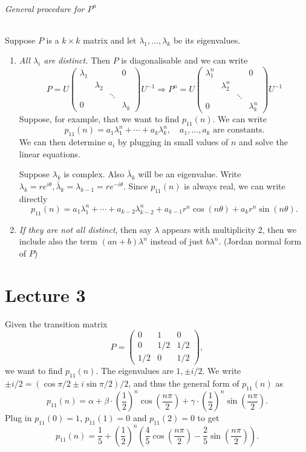 \documentclass[a4paper]{article}
\begin{document}
\paragraph*{General procedure for $ P^n $} Suppose $P$ is a $k\times k$ matrix and let $ \lambda_1,\dots,\lambda_k $ be its eigenvalues.
\begin{enumerate}[(1)]
    \item \textit{All $ \lambda_i $ are distinct.} Then $P$ is diagonalisable and we can write 
    \[
        P = U \begin{pmatrix}
            \lambda_1&&&0\\ 
            &\lambda_2&&\\ 
            &&\ddots&\\ 
            0&&&\lambda_k
        \end{pmatrix}U^{-1} \Longrightarrow P^n=U \begin{pmatrix}
            \lambda^n_1&&&0\\ 
            &\lambda^n_2&&\\ 
            &&\ddots&\\ 
            0&&&\lambda^n_k
        \end{pmatrix}U^{-1}
    \]
    Suppose, for example, that we want to find $p_{11}(n)$. We can write 
    \[
        p_{11}(n)=a_1 \lambda_1^n+\cdots + a_k \lambda_k^n,\quad a_1,\dots,a_k \text{ are constants}.
    \]
    We can then determine $a_i$ by plugging in small values of $n$ and solve the linear equations.

    Suppose $\lambda_k$ is complex. Also $ \bar{\lambda}_k $ will be an eigenvalue. Write $ \lambda_k=re^{i\theta}, \bar{\lambda}_k=\lambda_{k-1}=re^{-i\theta} $. Since $p_{11}(n)$ is always real, we can write directly
    \[
        p_{11}(n)=a_1 \lambda_1^n+\cdots + a_{k-2}\lambda_{k-2}^n+a_{k-1}r^{n}\cos (n\theta)+a_kr^n \sin (n\theta).
    \]
    \item \textit{If they are not all distinct}, then say $ \lambda $ appears with multiplicity 2, then we include also the term $ (an+b)\lambda^n $ instead of just $ b\lambda^n $. (Jordan normal form of $P$)
\end{enumerate}
\newpage
\part*{Lecture 3}
\begin{example}
	Given the transition matrix
	$$
	P = \begin{pmatrix}
		0 & 1 & 0 \\
		0 & 1/2 & 1/2 \\ 
		1/2 & 0 & 1/2
	\end{pmatrix},
	$$
	we want to find $p_{11}(n)$. The eigenvalues are $1, \pm i/2$. We write $\pm i/2 = (\cos \pi/2 \pm i \sin \pi/2)/2$, and thus the general form of $p_{11}(n)$ as
	$$
	p_{11}(n) = \alpha + \beta \cdot \left(\frac{1}{2}\right)^n \cos \left(\frac{n \pi}{2}\right) + \gamma \cdot \left(\frac{1}{2}\right)^n \sin\left(\frac{n \pi}{2}\right).
	$$
	Plug in $p_{11}(0) = 1$, $p_{11}(1) = 0$ and $p_{11}(2) = 0$ to get
	$$
	p_{11}(n) = \frac{1}{5} + \left(\frac{1}{2}\right)^n \left(\frac{4}{5}\cos\left(\frac{n \pi}{2}\right) - \frac{2}{5} \sin \left(\frac{n \pi}{2}\right)\right).
	$$
\end{example}
\end{document}
